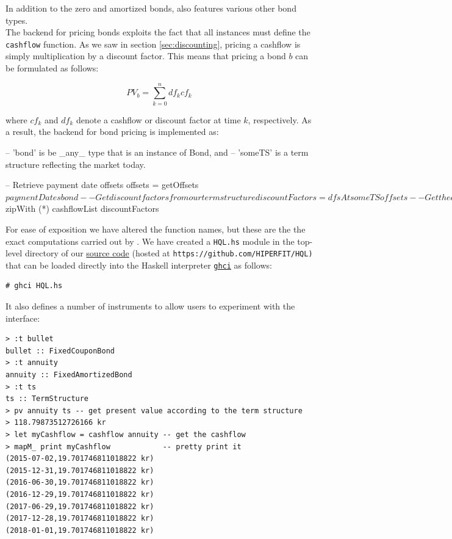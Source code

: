 In addition to the zero and amortized bonds, \hql also features various other
bond types\cite{hqldoc}.\\

The backend for pricing bonds exploits the fact that all instances must define
the \texttt{cashflow} function. As we saw in section \ref{sec:discounting},
pricing a cashflow is simply multiplication by a discount factor. This means
that pricing a bond $b$ can be formulated as follows:

\begin{equation}
PV_b = \sum_{k=0}^n df_k cf_k
\end{equation}

where $cf_k$ and $df_k$ denote a cashflow or discount factor at time $k$,
respectively. As a result, the backend for bond pricing is implemented as:

\begin{hscode}
-- 'bond' is be _any_ type that is an instance of Bond, and 
-- 'someTS' is a term structure reflecting the market today.

-- Retrieve payment date offsets
offsets = getOffsets $ paymentDates bond 

-- Get discount factors from our term structure
discountFactors = dfsAt someTS offsets

-- Get the cashflow of the bond
cashflowList    = cashflow bond

-- Price it!
pv = sum $ zipWith (*) cashflowList discountFactors
\end{hscode}

For ease of exposition we have altered the function names, but these are the 
the exact computations carried out by \hql. We have created a \texttt{HQL.hs}
module in the top-level directory of our
\href{https://github.com/HIPERFIT/HQL}{source code} (hosted at 
\texttt{https://github.com/HIPERFIT/HQL)} that can be loaded directly into
the Haskell interpreter 
\href{http://www.haskell.org/haskellwiki/GHC/GHCi}{\texttt{ghci}} as follows:\\

\begin{lstlisting}[style=BashInputStyle]
# ghci HQL.hs
\end{lstlisting}
\vspace{0.3cm}
It also defines a number of instruments to allow users to experiment with the
interface:\\

\begin{lstlisting}[style=BashInputStyle]
> :t bullet
bullet :: FixedCouponBond
> :t annuity
annuity :: FixedAmortizedBond 
> :t ts
ts :: TermStructure 
> pv annuity ts -- get present value according to the term structure
> 118.79873512726166 kr
> let myCashflow = cashflow annuity -- get the cashflow
> mapM_ print myCashflow            -- pretty print it
(2015-07-02,19.701746811018822 kr)
(2015-12-31,19.701746811018822 kr)
(2016-06-30,19.701746811018822 kr)
(2016-12-29,19.701746811018822 kr)
(2017-06-29,19.701746811018822 kr)
(2017-12-28,19.701746811018822 kr)
(2018-01-01,19.701746811018822 kr)
\end{lstlisting}

